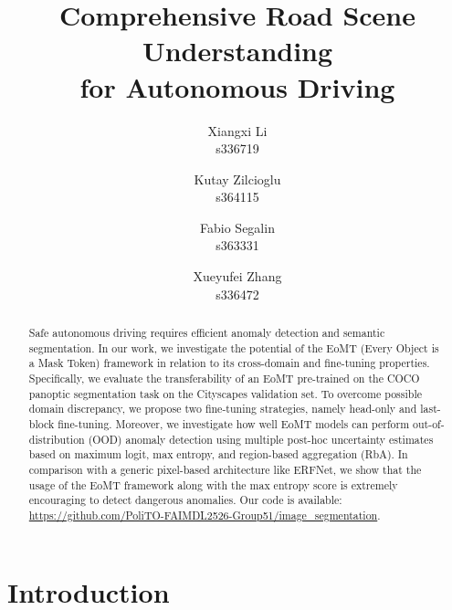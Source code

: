 \documentclass[10pt,twocolumn,letterpaper]{article}
\title{Comprehensive Road Scene Understanding\\
for Autonomous Driving}
\author{Xiangxi Li\\
s336719
\and
Kutay Zilcioglu\\
s364115
\and
Fabio Segalin\\
s363331
\and
Xueyufei Zhang\\
s336472
}
\begin{document}
\maketitle


\begin{abstract}
Safe autonomous driving requires efficient anomaly detection and semantic segmentation. In our work, we investigate the potential of the EoMT (Every Object is a Mask Token) framework in relation to its cross-domain and fine-tuning properties. Specifically, we evaluate the transferability of an EoMT pre-trained on the COCO panoptic segmentation task on the Cityscapes validation set. To overcome possible domain discrepancy, we propose two fine-tuning strategies, namely head-only and last-block fine-tuning. Moreover, we investigate how well EoMT models can perform out-of-distribution (OOD) anomaly detection using multiple post-hoc uncertainty estimates based on maximum logit, max entropy, and region-based aggregation (RbA). In comparison with a generic pixel-based architecture like ERFNet, we show that the usage of the EoMT framework along with the max entropy score is extremely encouraging to detect dangerous anomalies. Our code is available: \url{https://github.com/PoliTO-FAIMDL2526-Group51/image_segmentation}.
\end{abstract}



\section{Introduction}
\end{document}
